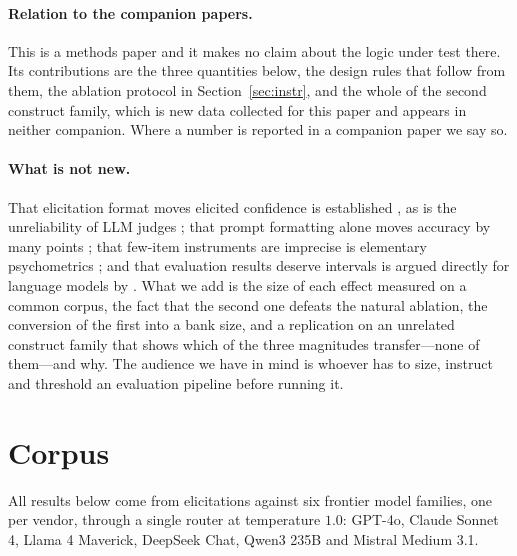 \documentclass[11pt,letterpaper]{article}
\begin{document}
\paragraph{Relation to the companion papers.} This is a methods paper and it makes no claim
about the logic under test there. Its contributions are the three quantities below, the design
rules that follow from them, the ablation protocol in Section~\ref{sec:instr}, and the whole of
the second construct family, which is new data collected for this paper and appears in neither
companion. Where a number is reported in a companion paper we say so.

\paragraph{What is not new.} That elicitation format moves elicited confidence is established
\citep{protocolsens2026}, as is the unreliability of LLM judges \citep{coinflip2026}; that
prompt formatting alone moves accuracy by many points \citep{sclar2024quantifying}; that
few-item instruments are imprecise is elementary psychometrics \citep{cronbach1972}; and that evaluation results deserve intervals is argued directly for
language models by \citet{miller2024errorbars}. What we add is the size of each
effect measured on a common corpus, the fact that the second one defeats the natural
ablation, the conversion of the first into a bank size, and a replication on an unrelated
construct family that shows which of the three magnitudes transfer---none of them---and why.
The audience we have in mind is whoever has to size, instruct and threshold an evaluation
pipeline before running it.

\section{Corpus}
\label{sec:corpus}

All results below come from elicitations against six frontier model families, one per vendor,
through a single router at temperature $1.0$: GPT-4o, Claude Sonnet 4, Llama 4 Maverick,
DeepSeek Chat, Qwen3 235B and Mistral Medium 3.1.
\end{document}
